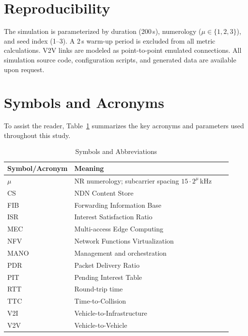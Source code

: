 \documentclass[journal]{IEEEtran}
\begin{document}
\appendices
\section{Reproducibility}
\label{app:repro}
The simulation is parameterized by duration (200\,s), numerology ($\mu\in\{1,2,3\}$), and seed index (1--3). A 2\,s warm-up period is excluded from all metric calculations. V2V links are modeled as point-to-point emulated connections. All simulation source code, configuration scripts, and generated data are available upon request.

\section{Symbols and Acronyms}
\label{abbrev}
To assist the reader, Table~\ref{tab:symbols} summarizes the key acronyms and parameters used throughout this study.

\begin{table}[!htbp]\centering
\caption{Symbols and Abbreviations}
\label{tab:symbols}
\footnotesize
\begin{tabular}{@{}p{0.22\linewidth}p{0.70\linewidth}@{}}
\toprule
Symbol/Acronym & Meaning\\
\midrule
$\mu$ & NR numerology; subcarrier spacing $15\cdot2^\mu$\,kHz\\
CS & NDN Content Store\\
FIB & Forwarding Information Base\\
ISR & Interest Satisfaction Ratio\\
MEC & Multi-access Edge Computing\\
NFV & Network Functions Virtualization\\
MANO & Management and orchestration\\
PDR & Packet Delivery Ratio\\
PIT & Pending Interest Table\\
RTT & Round-trip time\\
TTC & Time-to-Collision\\
V2I & Vehicle-to-Infrastructure\\
V2V & Vehicle-to-Vehicle\\
\bottomrule
\end{tabular}
\end{table}
\end{document}
